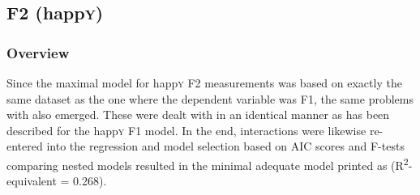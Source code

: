 \subsection{F2 (happ\textsc{y})}
\label{sec.prod.res.vow.happy.f2}

\subsubsection{Overview}
\label{sec.prod.res.vow.happy.f2.overview}

Since the maximal model for happ\textsc{y} F2 measurements was based on exactly the same dataset as the one where the dependent variable was F1, the same problems with  also emerged.
These were dealt with in an identical manner as has been described for the happ\textsc{y} F1 model.
In the end, interactions were likewise re-entered into the regression and model selection based on AIC scores and F-tests comparing nested models resulted in the minimal adequate model printed as  (R\textsuperscript{2}-equivalent = 0.268).

